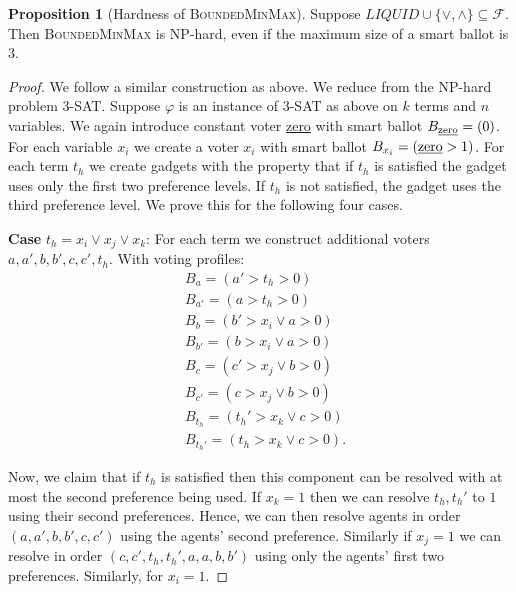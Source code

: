 \documentclass[11pt,a4paper, titlepage]{article}
\theoremstyle{definition}
\newtheorem{proposition}[theorem]{Proposition}
\begin{document}
\begin{proposition}[Hardness of \textsc{BoundedMinMax}]
    Suppose $\mathit{LIQUID} \cup \{\lor, \land\} \subseteq \mathcal{F}$. Then \textsc{BoundedMinMax} is NP-hard, even if the maximum size of a smart ballot is 3.    
\end{proposition}

\begin{proof}
    We follow a similar construction as above. We reduce from the NP-hard problem \textsc{3-SAT}. Suppose $\varphi$ is an instance of \textsc{3-SAT} as above on $k$ terms and $n$ variables. We again introduce constant voter \underline{zero} with smart ballot $B_{\text{\underline{zero}}} = (0)$. For each variable $x_i$ we create a voter $x_i$ with smart ballot $B_{x_i} = (\text{\underline{zero}} > 1)$. For each term $t_h$ we create gadgets with the property that if $t_h$ is satisfied the gadget uses only the first two preference levels. If $t_h$ is not satisfied, the gadget uses the third preference level. We prove this for the following four cases.

    \textbf{Case} $t_h = x_i \lor x_j \lor x_k$:
    For each term we construct additional voters $a, a', b, b', c, c', t_h$. With voting profiles: 
    \begin{align*}
        &B_a = (a' > t_h > 0) \\
        &B_{a'} = (a > t_h > 0) \\
        &B_{b} = (b' > x_i \lor a > 0) \\
        &B_{b'} = (b > x_i \lor a > 0) \\
        &B_{c} = (c' > x_j \lor b > 0) \\
        &B_{c'} = (c > x_j \lor b > 0) \\
        &B_{t_h} = (t_h' > x_k \lor c > 0) \\
        &B_{t_h'} = (t_h > x_k \lor c > 0).
    \end{align*}

    Now, we claim that if $t_h$ is satisfied then this component can be resolved with at most the second preference being used. 
    If $x_k = 1$ then we can resolve $t_h, t_h'$ to $1$ using their second preferences. 
    Hence, we can then resolve agents in order $(a, a', b, b', c, c')$ using the agents' second preference. 
    Similarly if $x_j = 1$ we can resolve in order $(c, c', t_h, t_h', a, a, b, b')$ using only the agents' first two preferences. Similarly, for $x_i = 1$.


\end{proof}
\end{document}
